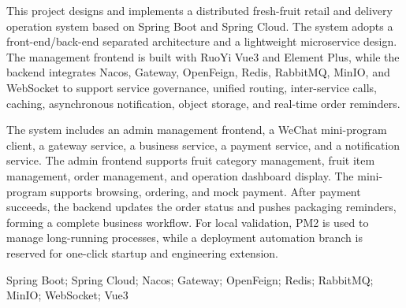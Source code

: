 {\rmfamily{}\setlength{\parindent}{2em}\linespread{1.45}\selectfont
This project designs and implements a distributed fresh-fruit retail and delivery operation system based on Spring Boot and Spring Cloud. The system adopts a front-end/back-end separated architecture and a lightweight microservice design. The management frontend is built with RuoYi Vue3 and Element Plus, while the backend integrates Nacos, Gateway, OpenFeign, Redis, RabbitMQ, MinIO, and WebSocket to support service governance, unified routing, inter-service calls, caching, asynchronous notification, object storage, and real-time order reminders.

The system includes an admin management frontend, a WeChat mini-program client, a gateway service, a business service, a payment service, and a notification service. The admin frontend supports fruit category management, fruit item management, order management, and operation dashboard display. The mini-program supports browsing, ordering, and mock payment. After payment succeeds, the backend updates the order status and pushes packaging reminders, forming a complete business workflow. For local validation, PM2 is used to manage long-running processes, while a deployment automation branch is reserved for one-click startup and engineering extension.

\vspace{0.45cm}
 Spring Boot; Spring Cloud; Nacos; Gateway; OpenFeign; Redis; RabbitMQ; MinIO; WebSocket; Vue3
\par}
